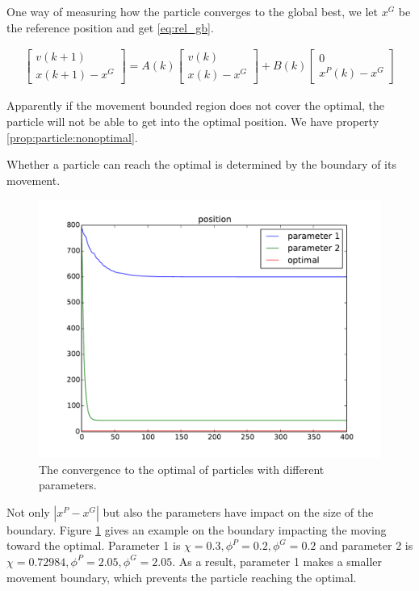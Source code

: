 One way of measuring how the particle converges to the global best, we let $ x^{G} $ be the reference position and get \eqref{eq:rel_gb}.

\begin{equation}
\label{eq:rel_gb}
\begin{aligned}
\begin{bmatrix}
v(k+1) \\
x(k+1) - x^{G}
\end{bmatrix}
 = A(k) 
\begin{bmatrix}
v(k) \\
x(k) - x^{G}
\end{bmatrix}
+ B(k) 
\begin{bmatrix}
0 \\
x^{P}(k) - x^{G}
\end{bmatrix}
\end{aligned}
\end{equation}

Apparently if the movement bounded region does not cover the optimal, the particle will not be able to get into the optimal position.
We have property \ref{prop:particle:nonoptimal}.

\begin{myprop}
\label{prop:particle:nonoptimal}
Whether a particle can reach the optimal is determined by the boundary of its movement.
\end{myprop}

\begin{figure}[tbph]
\centering
\includegraphics[width=0.7\linewidth]{./simfig/bound/bound_position}
\caption{The convergence to the optimal of particles with different parameters.}
\label{fig:bound_position}
\end{figure}

Not only $ | x^{P} - x^{G} | $ but also the parameters have impact on the size of the boundary.
Figure \ref{fig:bound_position} gives an example on the boundary impacting the moving toward the optimal.
Parameter 1 is $ \chi = 0.3, \phi^{P} = 0.2, \phi^{G} = 0.2 $ and parameter 2 is $ \chi = 0.72984, \phi^{P} = 2.05, \phi^{G} = 2.05 $.
As a result, parameter 1 makes a smaller movement boundary, which prevents the particle reaching the optimal.

